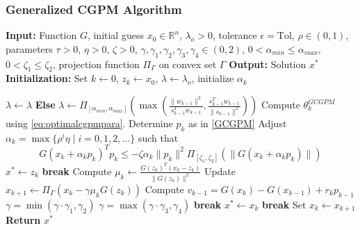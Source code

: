 \documentclass{article}
\theoremstyle{remark}
\begin{document}
\subsubsection{Generalized CGPM Algorithm}
{\renewcommand{\baselinestretch}{0.95}
{\begin{algorithm}[H]
    \caption{Generalized CGPM}
    \label{algorithm:gcgpm}
    \begin{algorithmic}[1]
        \State \textbf{Input:} Function $G$, initial guess $x_0 \in \mathbb{R}^n$, 
        $\lambda_o > 0$, tolerance $\epsilon = \text{Tol}$, 
        $\rho \in (0, 1)$, parameters $\tau > 0$, $\eta > 0$, $\zeta > 0$, $\gamma, \gamma_1, \gamma_2, \gamma_3, \gamma_4 \in (0, 2) $, $0<\alpha_{min}\leq \alpha_{max}$, $0<\zeta_1\leq \zeta_2$,  projection function 
        $\Pi_{\Gamma}$ on convex set $\Gamma$
        \State \textbf{Output:} Solution $x^*$
        \State \textbf{Initialization:} Set $k \gets 0$, $z_k \gets x_0$, $\lambda \gets \lambda_o$, initialize $\alpha_k$
        
                \State $\lambda \gets \lambda$
                \State \textbf{Else}
                {$\lambda \gets \Pi_{[\alpha_{min}, \alpha_{max}]}(\max(\frac{\|w_{k-1}\|^2}{s_{k-1}^Tw_{k-1}}, \frac{s_{k-1}^Tw_{k-1}}{\|s_{k-1}\|^2}))$}
            \EndIf
            \State Compute $\theta_k^{GCGPM} $ using \eqref{eq:optimalcgpmpara}.
            \State Determine $p_k$ as in \eqref{GCGPM}
            \State Adjust $\alpha_k = \max \{ \rho^i \eta \mid i = 0, 1, 2, \dots \}$ such that 
            \begin{equation}
                G(x_k + \alpha_k p_k)^T p_k \leq -\zeta \alpha_k \| p_k \|^2 \Pi_{[\zeta_1, \zeta_2]}(\| G(x_k + \alpha_k p_k) \|)
                \label{eq:backtrack2}
            \end{equation}
                \State $x^* \gets z_k$
                \State \textbf{break}
            \EndIf
            \State Compute $\mu_k \gets \frac{G(z_k)^T (x_k - z_k)}{\| G(z_k) \|^2}$
            \State Update $x_{k+1} \gets \Pi_{\Gamma}(x_k - \gamma \mu_k G(z_k))$
            \State Compute $v_{k-1}=G(x_k)-G(x_{k-1})+r_kp_{k-1}$
    \State $\gamma = \min(\gamma \cdot \gamma_1, \gamma_2)$
\Else
    \State $\gamma = \max(\gamma \cdot \gamma_3, \gamma_4)$
    \State \textbf{break}
\EndIf
                \State $x^* \gets x_k$
                \State \textbf{break}
            \EndIf
            \State Set $x_k \gets x_{k+1}$
        \EndWhile
        \State \textbf{Return} $x^*$
    \end{algorithmic}
\end{algorithm}
\renewcommand{\baselinestretch}{1.50}
}
\newpage
}
\end{document}
